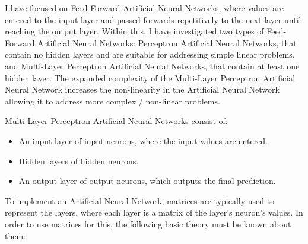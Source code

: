 \documentclass[./project-report/src/latex/project-report.tex]{subfiles}
\begin{document}
I have focused on Feed-Forward Artificial Neural Networks, where values are entered to the input layer and passed forwards repetitively to the next layer until 
reaching the output layer. Within this, I have investigated two types of Feed-Forward Artificial Neural Networks: Perceptron Artificial Neural Networks, that contain no 
hidden layers and are suitable for addressing simple linear problems, and Multi-Layer Perceptron Artificial Neural Networks, that contain at least one hidden layer. 
The expanded complexity of the Multi-Layer Perceptron Artificial Neural Network increases the non-linearity in the Artificial Neural Network allowing it to address 
more complex / non-linear problems.

\vspace{5mm}

\noindent
Multi-Layer Perceptron Artificial Neural Networks consist of:

\begin{itemize}
    \item An input layer of input neurons, where the input values are entered.
    \item Hidden layers of hidden neurons.
    \item An output layer of output neurons, which outputs the final prediction.
\end{itemize}

To implement an Artificial Neural Network, matrices are typically used to represent the layers, where each layer is a matrix of the layer's neuron's values. In 
order to use matrices for this, the following basic theory must be known about them:
\end{document}
